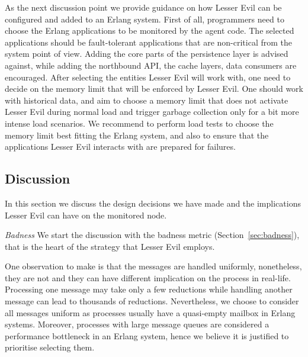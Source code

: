 \documentclass{llncs}
\begin{document}
As the next discussion point we provide guidance on how Lesser Evil can be configured and added to an Erlang system. First of all, programmers need to choose the Erlang applications to be monitored by the agent code. The selected applications should be fault-tolerant applications that are non-critical from the system point of view. Adding the core parts of the persistence layer is advised against, while adding the northbound API, the cache layers, data consumers are encouraged. After selecting the entities Lesser Evil will work with, one need to decide on the memory limit that will be enforced by Lesser Evil. One should work with historical data, and aim to choose a memory limit that does not activate Lesser Evil during normal load and trigger garbage collection only for a bit more intense load scenarios. We recommend to perform load tests to choose the memory limit best fitting the Erlang system, and also to ensure that the applications Lesser Evil interacts with are prepared for failures.


\subsection{Discussion}
In this section we discuss the design decisions we have made and the implications Lesser Evil can have on the monitored node.

\emph{Badness} We start the discussion with the badness metric (Section~\ref{sec:badness}), that is the heart of the strategy that Lesser Evil employs. 

One observation to make is that the messages are handled uniformly, nonetheless, they are not and they can have different implication on the process in real-life. Processing one message may take only a few reductions while handling another message can lead to thousands of reductions. Nevertheless, we choose to consider all messages uniform as processes usually have a quasi-empty mailbox in Erlang systems. Moreover, processes with large message queues are considered a performance bottleneck in an Erlang system, hence we believe it is justified to prioritise selecting them. 
\end{document}
